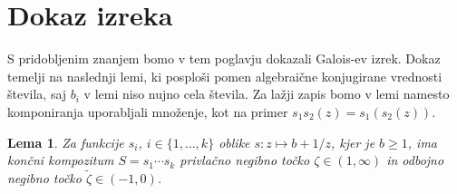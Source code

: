 \documentclass[a4paper,12pt]{article}
\newtheorem{lema}{Lema}
\begin{document}

\section{Dokaz izreka}

S pridobljenim znanjem bomo v tem poglavju dokazali Galois-ev izrek. Dokaz temelji na naslednji lemi, ki posploši pomen algebraične konjugirane vrednosti števila, saj $b_i$ v lemi niso nujno cela števila. Za lažji zapis bomo v lemi namesto komponiranja uporabljali množenje, kot na primer $s_1s_2(z) = s_1(s_2(z))$.

\begin{lema}
    Za funkcije $s_i$, $i \in \{1, \ldots, k\}$ oblike $s : z \mapsto b + 1/z$, kjer je $b \geq 1$, ima končni kompozitum $S = s_1 \cdots s_k$ privlačno negibno točko $\zeta \in (1, \infty)$ in odbojno negibno točko $\tilde{\zeta} \in (-1, 0)$. 
\end{lema}
\end{document}
